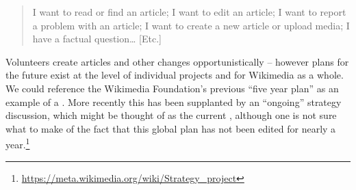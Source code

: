 \begin{quotation}
\noindent 
I want to read or find an article;
I want to edit an article;
I want to report a problem with an article;
I want to create a new article or upload media;
I have a factual question\ldots
[Etc.]
\end{quotation}
%
%
%
%
Volunteers create articles and other changes opportunistically --
however plans for the future exist at the level of individual projects
and for Wikimedia as a whole.  We could reference the Wikimedia
Foundation's previous ``five year plan'' as an example of a
 \cite{wikimedia2011plan}.  More recently this
has been supplanted by an ``ongoing'' strategy discussion, which might
be thought of as the current , although one is
not sure what to make of the fact that this global plan has not been
edited for nearly a
year.\footnote{\url{https://meta.wikimedia.org/wiki/Strategy_project}}
%

